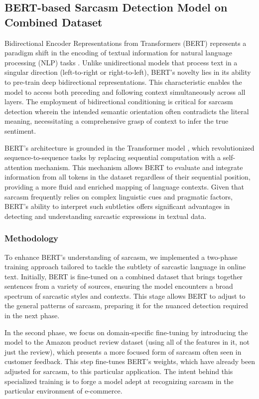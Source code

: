 \documentclass[10pt,twocolumn,letterpaper]{article}
\begin{document}
\subsection{BERT-based Sarcasm Detection Model on Combined Dataset}

Bidirectional Encoder Representations from Transformers (BERT) represents a paradigm shift in the encoding of textual information for natural language processing (NLP) tasks \cite{devlin2018bert}. Unlike unidirectional models that process text in a singular direction (left-to-right or right-to-left), BERT's novelty lies in its ability to pre-train deep bidirectional representations. This characteristic enables the model to access both preceding and following context simultaneously across all layers. The employment of bidirectional conditioning is critical for sarcasm detection wherein the intended semantic orientation often contradicts the literal meaning, necessitating a comprehensive grasp of context to infer the true sentiment.

BERT's architecture is grounded in the Transformer model \cite{vaswani2017attention}, which revolutionized sequence-to-sequence tasks by replacing sequential computation with a self-attention mechanism. This mechanism allows BERT to evaluate and integrate information from all tokens in the dataset regardless of their sequential position, providing a more fluid and enriched mapping of language contexts. Given that sarcasm frequently relies on complex linguistic cues and pragmatic factors, BERT's ability to interpret such subtleties offers significant advantages in detecting and understanding sarcastic expressions in textual data.

\subsubsection{Methodology}  
To enhance BERT's understanding of sarcasm, we implemented a two-phase training approach tailored to tackle the subtlety of sarcastic language in online text. Initially, BERT is fine-tuned on a combined dataset that brings together sentences from a variety of sources, ensuring the model encounters a broad spectrum of sarcastic styles and contexts. This stage allows BERT to adjust to the general patterns of sarcasm, preparing it for the nuanced detection required in the next phase.

In the second phase, we focus on domain-specific fine-tuning by introducing the model to the Amazon product review dataset (using all of the features in it, not just the review), which presents a more focused form of sarcasm often seen in customer feedback. This step fine-tunes BERT's weights, which have already been adjusted for sarcasm, to this particular application. The intent behind this specialized training is to forge a model adept at recognizing sarcasm in the particular environment of e-commerce.
\end{document}
